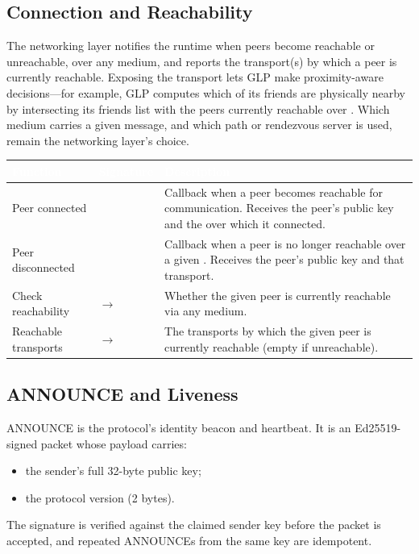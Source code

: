 \subsection{Connection and Reachability}
\label{sec:reachability}
The networking layer notifies the runtime when peers become reachable or unreachable, over any medium, and reports the transport(s) by which a peer is currently reachable.  Exposing the transport lets GLP make proximity-aware decisions---for example, GLP computes which of its friends are physically nearby by intersecting its friends list with the peers currently reachable over .  Which medium carries a given message, and which path or rendezvous server is used, remain the networking layer's choice.
\begin{longtable}{L{4cm} L{5cm} L{5cm}}
\toprule
{}
\textcolor{white}{\textbf{Function}} &
\textcolor{white}{\textbf{Signature}} &
\textcolor{white}{\textbf{Description}} \\
\midrule
\endhead
Peer connected &  & Callback when a peer becomes reachable for communication.  Receives the peer's public key and the  over which it connected. \\
Peer disconnected &  & Callback when a peer is no longer reachable over a given .  Receives the peer's public key and that transport. \\
Check reachability &  $\to$  & Whether the given peer is currently reachable via any medium. \\
Reachable transports &  $\to$  & The transports by which the given peer is currently reachable (empty if unreachable). \\
\bottomrule
\end{longtable}

\subsection{ANNOUNCE and Liveness}
\label{sec:announce}
ANNOUNCE is the protocol's identity beacon and heartbeat.  It is an Ed25519-signed packet whose payload carries:
\begin{itemize}
\item the sender's full 32-byte public key;
\item the protocol version (2 bytes).
\end{itemize}
The signature is verified against the claimed sender key before the packet is accepted, and repeated ANNOUNCEs from the same key are idempotent.

